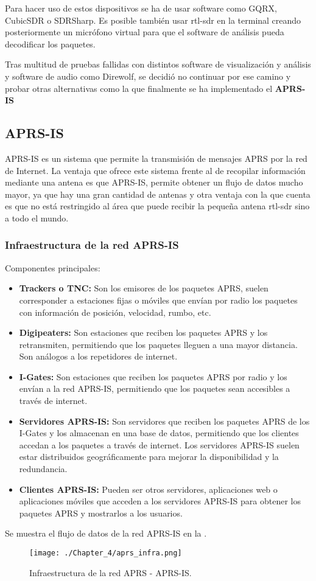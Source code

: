 Para hacer uso de estos dispositivos se ha de usar software como GQRX, CubicSDR o SDRSharp. Es posible también usar rtl-sdr en la terminal creando posteriormente un micrófono virtual para que el software de análisis pueda decodificar los paquetes.

Tras multitud de pruebas fallidas con distintos software de visualización y análisis y software de audio como Direwolf, se decidió no continuar por ese camino y probar otras alternativas como la que finalmente se ha implementado el \textbf{APRS-IS}

\subsection{APRS-IS}
APRS-IS es un sistema que permite la transmisión de mensajes APRS por la red de Internet. La ventaja que ofrece este sistema frente al de recopilar información mediante una antena es que APRS-IS, permite obtener un flujo de datos mucho mayor, ya que hay una gran cantidad de antenas y otra ventaja con la que cuenta es que no está restringido al área que puede recibir la pequeña antena rtl-sdr sino a todo el mundo.

\subsubsection{Infraestructura de la red APRS-IS}
Componentes principales:
\begin{itemize}
	\item \textbf{Trackers o TNC:} Son los emisores de los paquetes APRS, suelen corresponder a estaciones fijas o móviles que envían por radio los paquetes con información de posición, velocidad, rumbo, etc.
	\item \textbf{Digipeaters:} Son estaciones que reciben los paquetes APRS y los retransmiten, permitiendo que los paquetes lleguen a una mayor distancia. Son análogos a los repetidores de internet.
	\item \textbf{I-Gates:} Son estaciones que reciben los paquetes APRS por radio y los envían a la red APRS-IS, permitiendo que los paquetes sean accesibles a través de internet.
	\item \textbf{Servidores APRS-IS:} Son servidores que reciben los paquetes APRS de los I-Gates y los almacenan en una base de datos, permitiendo que los clientes accedan a los paquetes a través de internet. Los servidores APRS-IS suelen estar distribuidos geográficamente para mejorar la disponibilidad y la redundancia.
	\item \textbf{Clientes APRS-IS:} Pueden ser otros servidores, aplicaciones web o aplicaciones móviles que acceden a los servidores APRS-IS para obtener los paquetes APRS y mostrarlos a los usuarios.
\end{itemize}
Se muestra el flujo de datos de la red APRS-IS en la .
\begin{figure}[!h]
	\centering
	\texttt{[image: ./Chapter\_4/aprs\_infra.png]}
	\caption{Infraestructura de la red APRS - APRS-IS.}
	\label{fig:aprs-infra}
\end{figure}

